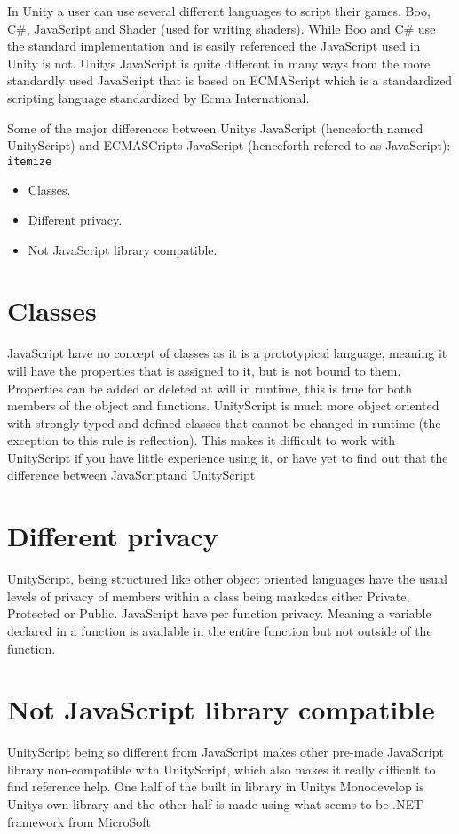 In Unity a user can use several different languages to script their games. Boo, C\#, JavaScript and Shader (used for writing shaders).
While Boo and C\#  use the standard implementation and is easily referenced the JavaScript used in Unity is not.
Unitys JavaScript is quite different in many ways from the more standardly used JavaScript that is based on ECMAScript which is a standardized scripting
language standardized by Ecma International.

Some of the major differences between Unitys JavaScript (henceforth named UnityScript) and ECMASCripts JavaScript (henceforth refered to as JavaScript):
\texttt{itemize}
\begin{itemize}
	\item Classes.
	\item Different privacy.
	\item Not JavaScript library compatible.
\end{itemize}

\section {Classes}
JavaScript have no concept of classes as it is a prototypical language, meaning it will have the properties that is assigned to it, but is not bound to them.
Properties can be added or deleted at will in runtime, this is true for both members of the object and functions. UnityScript is much more object oriented with strongly typed and defined classes that cannot be changed in runtime (the exception to this rule is reflection).
This makes it difficult to work with UnityScript if you have little experience using it, or have yet to find out that the difference between JavaScriptand UnityScript



\section {Different privacy}
UnityScript, being structured like other object oriented languages have the usual levels of privacy of members within a class being markedas either Private, Protected or Public. JavaScript have per function privacy. Meaning a variable declared in a function is available in the entire function but not
outside of the function.

\section {Not JavaScript library compatible}
UnityScript being so different from JavaScript makes other pre-made JavaScript library non-compatible with UnityScript, which also makes it really difficult to find reference help. One half of the built in library in Unitys Monodevelop is Unitys own library and the other half is made using what seems to be .NET framework from MicroSoft

